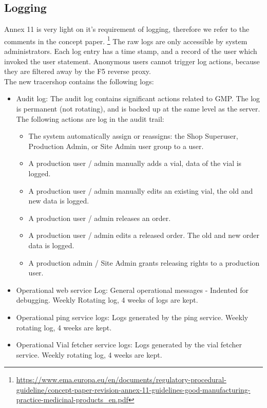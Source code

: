 \documentclass{article}
\begin{document}
\subsection*{Logging}
Annex 11 is very light on it's requirement of logging, therefore we refer to the
comments in the concept paper. \footnote{\url{https://www.ema.europa.eu/en/documents/regulatory-procedural-guideline/concept-paper-revision-annex-11-guidelines-good-manufacturing-practice-medicinal-products_en.pdf}}
The raw logs are only accessible by system administrators. Each log entry has a
time stamp, and a record of the user which invoked the user statement.
Anonymous users cannot trigger log actions, because they are filtered away by
the F5 reverse proxy.\\
The new tracershop contains the following logs:
\begin{itemize}
  \item Audit log: The audit log contains significant actions related to GMP.
  The log is permanent (not rotating), and is backed up at the same level as the
  server. The following actions are log in the audit trail:
  \begin{itemize}
    \item The system automatically assign or reassigns: the Shop Superuser, Production Admin, or
    Site Admin user group to a user.
    \item A production user / admin manually adds a vial, data of the vial is
    logged.
    \item A production user / admin manually edits an existing vial, the old and
    new data is logged.
    \item A production user / admin releases an order.
    \item A production user / admin edits a released order. The old and new
    order data is logged.
    \item A production admin / Site Admin grants releasing rights to a
    production user.
  \end{itemize}
  \item Operational web service Log: General operational messages - Indented for
  debugging. Weekly Rotating log, 4 weeks of logs are kept.
  \item Operational ping service logs: Logs generated by the ping service.
  Weekly rotating log, 4 weeks are kept.
  \item Operational Vial fetcher service logs: Logs generated by the vial
  fetcher service. Weekly rotating log, 4 weeks are kept.
\end{itemize}
\end{document}
